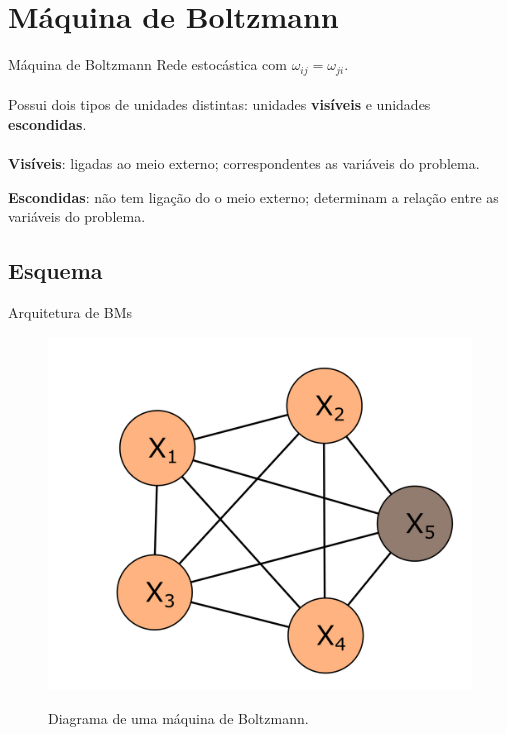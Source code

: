 \section{Máquina de Boltzmann}


\begin{frame}{Máquina de Boltzmann}%
  \justiying%
  Rede estocástica com $\omega_{ij} = \omega_{ji}$.
  \\~\\
  Possui dois tipos de unidades distintas: unidades \textbf{visíveis} e unidades \textbf{escondidas}.
  \\~\\
  \textbf{Visíveis}: ligadas ao meio externo; correspondentes as variáveis do problema.

  \textbf{Escondidas}: não tem ligação do o meio externo; determinam a relação entre as variáveis do problema.
\end{frame}

\subsection{Esquema}
\begin{frame}{Arquitetura de BMs}%
  \begin{figure}[h]{}%
    \label{fig:bm-diagram}%
    \includegraphics[scale=0.5]{images/bm_1.png}
    \caption{Diagrama de uma máquina de Boltzmann.\\
            \;}
  \end{figure}
\end{frame}

